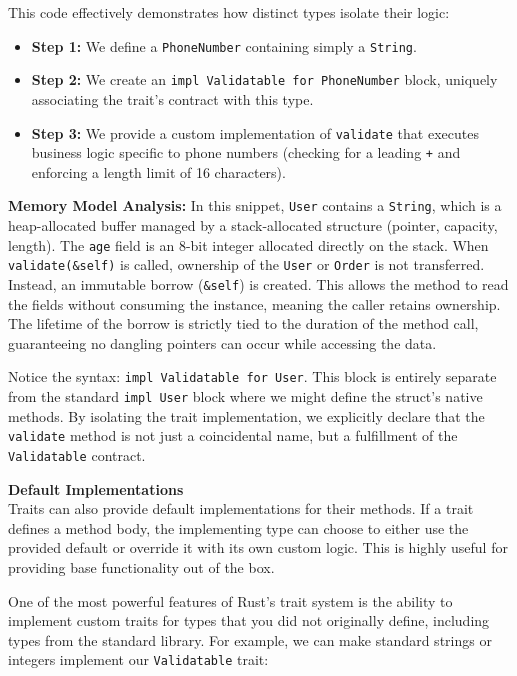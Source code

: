 This code effectively demonstrates how distinct types isolate their logic:
\begin{itemize}
    \item \textbf{Step 1:} We define a \texttt{PhoneNumber} containing simply a \texttt{String}.
    \item \textbf{Step 2:} We create an \texttt{impl Validatable for PhoneNumber} block, uniquely associating the trait's contract with this type.
    \item \textbf{Step 3:} We provide a custom implementation of \texttt{validate} that executes business logic specific to phone numbers (checking for a leading \texttt{+} and enforcing a length limit of 16 characters).
\end{itemize}

\textbf{Memory Model Analysis:} In this snippet, \texttt{User} contains a \texttt{String}, which is a heap-allocated buffer managed by a stack-allocated structure (pointer, capacity, length). The \texttt{age} field is an 8-bit integer allocated directly on the stack. When \texttt{validate(\&self)} is called, ownership of the \texttt{User} or \texttt{Order} is not transferred. Instead, an immutable borrow (\texttt{\&self}) is created. This allows the method to read the fields without consuming the instance, meaning the caller retains ownership. The lifetime of the borrow is strictly tied to the duration of the method call, guaranteeing no dangling pointers can occur while accessing the data.

Notice the syntax: \texttt{impl Validatable for User}. This block is entirely separate from the standard \texttt{impl User} block where we might define the struct's native methods. By isolating the trait implementation, we explicitly declare that the \texttt{validate} method is not just a coincidental name, but a fulfillment of the \texttt{Validatable} contract.

\begin{insightbox}
\textbf{Default Implementations} \\
Traits can also provide default implementations for their methods. If a trait defines a method body, the implementing type can choose to either use the provided default or override it with its own custom logic. This is highly useful for providing base functionality out of the box.
\end{insightbox}

One of the most powerful features of Rust's trait system is the ability to implement custom traits for types that you did not originally define, including types from the standard library. For example, we can make standard strings or integers implement our \texttt{Validatable} trait:

